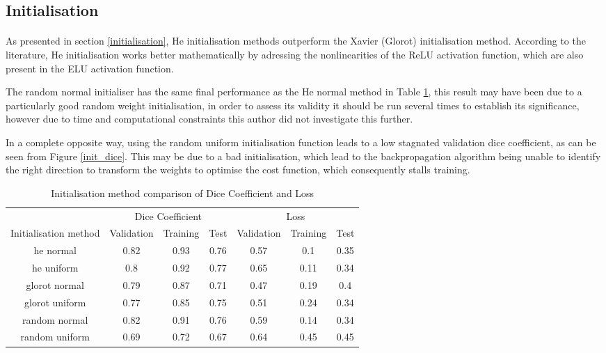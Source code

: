\subsection{Initialisation}
\paragraph{}
As presented in section \ref{initialisation}, He initialisation methods outperform the Xavier (Glorot) initialisation method. According to the literature, He initialisation works better mathematically by adressing the nonlinearities of the \gls{ReLU} activation function, which are also present in the \gls{ELU} activation function. 

The random normal initialiser has the same final performance as the He normal method in Table \ref{tab_init}, this result may have been due to a particularly good random weight initialisation, in order to assess its validity it should be run several times to establish its significance, however due to time and computational constraints this author did not investigate this further.

In a complete opposite way, using the random uniform initialisation function leads to a low stagnated validation dice coefficient, as can be seen from Figure \ref{init_dice}. This may be due to a bad initialisation, which lead to the backpropagation algorithm being unable to identify the right direction to transform the weights to optimise the cost function, which consequently stalls training.

\begin{table}[ht!] 
    \begin{center}
    \begin{tabular}{ccccccc} 
    \toprule
       & \multicolumn{3}{c}{Dice Coefficient}     & \multicolumn{3}{c}{Loss} \\
    Initialisation method & Validation & Training & Test & Validation & Training & Test \\ \midrule
    \rowcolor{lightgray} he normal & 0.82 & 0.93 & 0.76 & 0.57 & 0.1 & 0.35  \\ he uniform & 0.8 & 0.92 & 0.77 & 0.65 & 0.11 & 0.34  \\ glorot normal & 0.79 & 0.87 & 0.71 & 0.47 & 0.19 & 0.4 \\ glorot uniform & 0.77 & 0.85 & 0.75 & 0.51 & 0.24 & 0.34  \\ random normal & 0.82 & 0.91 & 0.76 & 0.59 & 0.14 & 0.34  \\ random uniform & 0.69 & 0.72 & 0.67 & 0.64 & 0.45 & 0.45  \\
    \bottomrule
    \end{tabular}
  \end{center} 
  \caption{Initialisation method comparison of Dice Coefficient and Loss}\label{tab_init}
\end{table}

